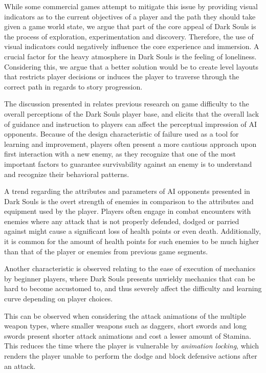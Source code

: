While some commercial games attempt to mitigate this issue by providing visual indicators as to the current objectives of a player and the path they should take given a game world state, we argue that part of the core appeal of Dark Souls is the process of exploration, experimentation and discovery. Therefore, the use of visual indicators could negatively influence the core experience and immersion. A crucial factor for the heavy atmosphere in Dark Souls is the feeling of loneliness. Considering this, we argue that a better solution would be to create level layouts that restricts player decisions or induces the player to traverse through the correct path in regards to story progression.


The discussion presented in \citet{YT_DarkSoulsSimpleAI} relates previous research on game difficulty to the overall perceptions of the Dark Souls player base, and elicits that the overall lack of guidance and instruction to players can affect the perceptual impression of AI opponents. Because of the design characteristic of failure used as a tool for learning and improvement, players often present a more cautious approach upon first interaction with a new enemy, as they recognize that one of the most important factors to guarantee survivability against an enemy is to understand and recognize their behavioral patterns. 

A trend regarding the attributes and parameters of AI opponents presented in Dark Souls is the overt strength of enemies in comparison to the attributes and equipment used by the player.  Players often engage in combat encounters with enemies where any attack that is not properly defended, dodged or parried against might cause a significant loss of health points or even death. Additionally, it is common for the amount of health points for such enemies to be much higher than that of the player or enemies from previous game segments.

Another characteristic is observed relating to the ease of execution of mechanics by beginner players, where Dark Souls presents unwieldy mechanics that can be hard to become accustomed to, and thus severely affect the difficulty and learning curve depending on player choices.

This can be observed when considering the attack animations of the multiple weapon types, where smaller weapons such as daggers, short swords and long swords present shorter attack animations and cost a lesser amount of Stamina. This reduces the time where the player is vulnerable by \emph{animation locking}, which renders the player unable to perform the dodge and block defensive actions after an attack.

